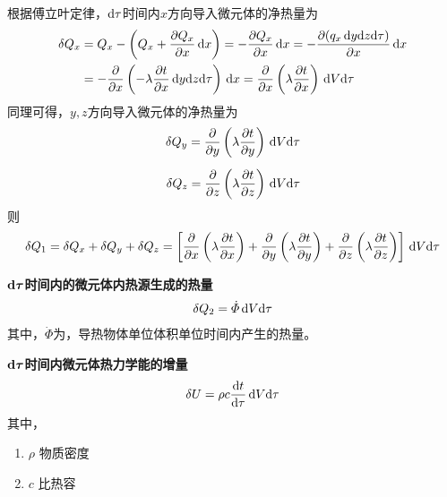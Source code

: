 根据傅立叶定律，${\rm{d}} \tau $时间内$x$方向导入微元体的净热量为
\begin{align}
	\delta Q_x  &= Q_x - \left(Q_x + \dfrac{\partial Q_x}{\partial x} \,{\rm{d}} x\right) = - \dfrac{\partial Q_x}{\partial x}\,{\rm{d}} x = - \dfrac{\partial (q_x \,{\rm{d}} y {\rm{d}} z {\rm{d}} \tau)}{\partial x} \, {\rm{d}} x \notag \\
	& = - \dfrac{\partial }{\partial x}\left(- \lambda \dfrac{\partial t}{\partial x}\, {\rm{d}} y {\rm{d}} z {\rm{d}} \tau \right)\, {\rm{d}} x = \dfrac{\partial }{\partial x}\left(\lambda \dfrac{\partial t}{\partial x}\right)\, {\rm{d}} V  {\rm{d}} \tau
\end{align}
同理可得，$y, z$方向导入微元体的净热量为
\begin{align}
	\delta Q_y = \dfrac{\partial }{\partial y}\left(\lambda \dfrac{\partial t}{\partial y}\right)\, {\rm{d}} V  {\rm{d}} \tau\\[0.5em]
	\delta Q_z = \dfrac{\partial }{\partial z}\left(\lambda \dfrac{\partial t}{\partial z}\right)\, {\rm{d}} V  {\rm{d}} \tau
\end{align}
则
\begin{align}
	\delta Q_1 = \delta Q_x + \delta Q_y + \delta Q_z = \left[\dfrac{\partial }{\partial x}\left(\lambda \dfrac{\partial t}{\partial x}\right) + \dfrac{\partial }{\partial y}\left(\lambda \dfrac{\partial t}{\partial y}\right) + \dfrac{\partial }{\partial z}\left(\lambda \dfrac{\partial t}{\partial z}\right) \right] \, {\rm{d}} V {\rm{d}} \tau
\end{align}


$\bm{{\rm{d}} \tau}$\textbf{时间内的微元体内热源生成的热量}
\begin{align}
	\delta Q_2 = \dot{\varPhi}\, {\rm{d}} V {\rm{d}} \tau
\end{align}
其中，$\dot{\varPhi}$为，导热物体单位体积单位时间内产生的热量。
\vspace*{1em}

$\bm{{\rm{d}} \tau}$\textbf{时间内微元体热力学能的增量}
\begin{align}
	\delta U = \rho c \dfrac{{\rm{d}} t}{{\rm{d}} \tau}\, {\rm{d}} V {\rm{d}} \tau
\end{align}
其中，\vspace*{-0.5em}
\begin{enumerate}[\hspace*{1.5em}]
	\item $\rho$ \quad 物质密度\vspace*{-0.5em}
	\item $c$ \quad 比热容\vspace*{-0.5em}
\end{enumerate}

